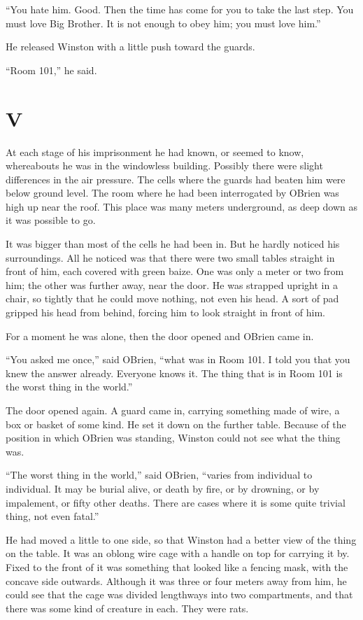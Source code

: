 ``You hate him. Good. Then the time has come for you to take the last
step. You must love Big Brother. It is not enough to obey him; you must
love him.''

He released Winston with a little push toward the guards.

``Room 101,'' he said.


\section{V}\label{v-2}

At each stage of his imprisonment he had known, or seemed to know,
whereabouts he was in the windowless building. Possibly there were
slight differences in the air pressure. The cells where the guards had
beaten him were below ground level. The room where he had been
interrogated by O\textquotesingle Brien was high up near the roof. This
place was many meters underground, as deep down as it was possible to
go.

It was bigger than most of the cells he had been in. But he hardly
noticed his surroundings. All he noticed was that there were two small
tables straight in front of him, each covered with green baize. One was
only a meter or two from him; the other was further away, near the door.
He was strapped upright in a chair, so tightly that he could move
nothing, not even his head. A sort of pad gripped his head from behind,
forcing him to look straight in front of him.

For a moment he was alone, then the door opened and
O\textquotesingle Brien came in.

``You asked me once,'' said O\textquotesingle Brien, ``what was in Room
101. I told you that you knew the answer already. Everyone knows it. The
thing that is in Room 101 is the worst thing in the world.''

The door opened again. A guard came in, carrying something made of wire,
a box or basket of some kind. He set it down on the further table.
Because of the position in which O\textquotesingle Brien was standing,
Winston could not see what the thing was.

``The worst thing in the world,'' said O\textquotesingle Brien, ``varies
from individual to individual. It may be burial alive, or death by fire,
or by drowning, or by impalement, or fifty other deaths. There are cases
where it is some quite trivial thing, not even fatal.''

He had moved a little to one side, so that Winston had a better view of
the thing on the table. It was an oblong wire cage with a handle on top
for carrying it by. Fixed to the front of it was something that looked
like a fencing mask, with the concave side outwards. Although it was
three or four meters away from him, he could see that the cage was
divided lengthways into two compartments, and that there was some kind
of creature in each. They were rats.

